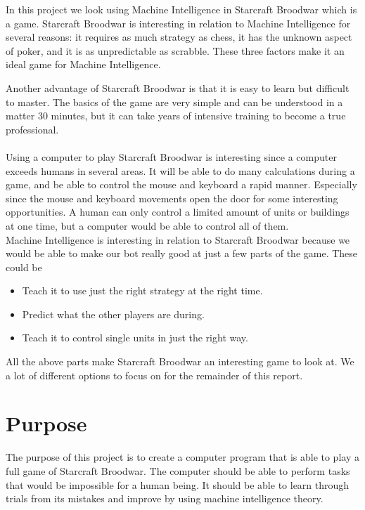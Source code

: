 In this project we look using Machine Intelligence in Starcraft Broodwar which is a \abrts game. Starcraft Broodwar is interesting in relation to Machine Intelligence for several reasons: it requires as much strategy as chess, it has the unknown aspect of poker, and it is as unpredictable as scrabble. These three factors make it an ideal game for Machine Intelligence.

Another advantage of Starcraft Broodwar is that it is easy to learn but difficult to master. The basics of the game are very simple and can be understood in a matter 30 minutes, but it can take years of intensive training to become a true professional. 
\\
\\
Using a computer to play Starcraft Broodwar is interesting since a computer exceeds humans in several areas. It will be able to do many calculations during a game, and be able to control the mouse and keyboard a rapid manner. Especially since the mouse and keyboard movements open the door for some interesting opportunities. A human can only control a limited amount of units or buildings at one time, but a computer would be able to control all of them. \\

Machine Intelligence is interesting in relation to Starcraft Broodwar because we would be able to make our bot really good at just a few parts of the game. These could be
\begin{itemize}
	\item Teach it to use just the right strategy at the right time.
	\item Predict what the other players are during.
	\item Teach it to control single units in just the right way.
\end{itemize}

All the above parts make Starcraft Broodwar an interesting game to look at. We a lot of different options to focus on for the remainder of this report.

\section{Purpose}

	The purpose of this project is to create a computer program that is able to play a full game of Starcraft Broodwar. The computer should be able to perform tasks that would be impossible for a human being. It should be able to learn through trials from its mistakes and improve by using machine intelligence theory. 


